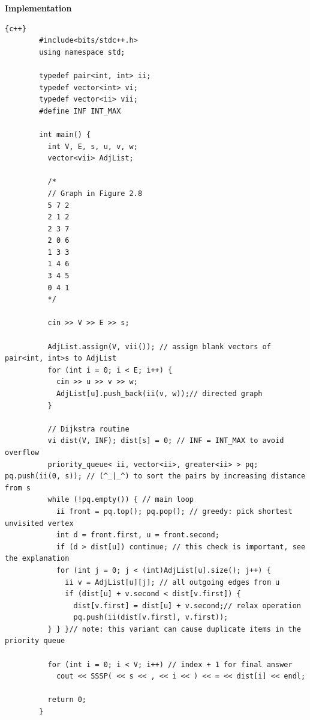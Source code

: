 \textbf{{\Large{Implementation}}}\newline
\begin{lstlisting}{c++}
        #include<bits/stdc++.h>
        using namespace std;
        
        typedef pair<int, int> ii;
        typedef vector<int> vi;
        typedef vector<ii> vii;
        #define INF INT_MAX
        
        int main() {
          int V, E, s, u, v, w;
          vector<vii> AdjList;
        
          /*
          // Graph in Figure 2.8
          5 7 2
          2 1 2
          2 3 7
          2 0 6
          1 3 3
          1 4 6
          3 4 5
          0 4 1
          */
        
          cin >> V >> E >> s;
        
          AdjList.assign(V, vii()); // assign blank vectors of pair<int, int>s to AdjList
          for (int i = 0; i < E; i++) {
            cin >> u >> v >> w;
            AdjList[u].push_back(ii(v, w));// directed graph
          }
        
          // Dijkstra routine
          vi dist(V, INF); dist[s] = 0; // INF = INT_MAX to avoid overflow
          priority_queue< ii, vector<ii>, greater<ii> > pq; pq.push(ii(0, s)); // (^_|_^) to sort the pairs by increasing distance from s
          while (!pq.empty()) { // main loop
            ii front = pq.top(); pq.pop(); // greedy: pick shortest unvisited vertex
            int d = front.first, u = front.second;
            if (d > dist[u]) continue; // this check is important, see the explanation
            for (int j = 0; j < (int)AdjList[u].size(); j++) {
              ii v = AdjList[u][j]; // all outgoing edges from u
              if (dist[u] + v.second < dist[v.first]) {
                dist[v.first] = dist[u] + v.second;// relax operation
                pq.push(ii(dist[v.first], v.first));
          } } }// note: this variant can cause duplicate items in the priority queue
        
          for (int i = 0; i < V; i++) // index + 1 for final answer
            cout << SSSP( << s << , << i << ) << = << dist[i] << endl;
        
          return 0;
        }
\end{lstlisting}

